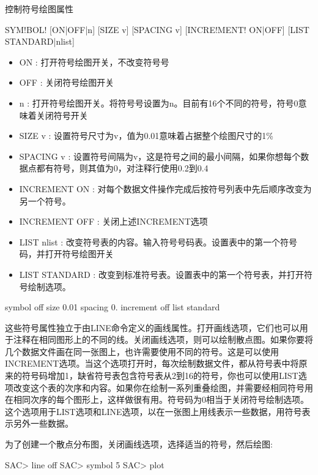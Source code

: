 \label{cmd:symbol}

控制符号绘图属性

\begin{SACSTX}
SYM!BOL! [ON|OFF|n] [SIZE v] [SPACING v] [INCRE!MENT! ON|OFF] 
    [LIST STANDARD|nlist]
\end{SACSTX}

\begin{itemize}
\item ON : 打开符号绘图开关，不改变符号号 
\item OFF : 关闭符号绘图开关 
\item n : 打开符号绘图开关。将符号号设置为n。目前有16个不同的符号，符号0意味着关闭符号开关  
\item SIZE v : 设置符号尺寸为v，值为0.01意味着占据整个绘图尺寸的1\%	
\item SPACING v : 设置符号间隔为v，这是符号之间的最小间隔，如果你想每个数据点都有符号，则其值为0，对注释行使用0.2到0.4
\item INCREMENT {ON} : 对每个数据文件操作完成后按符号列表中先后顺序改变为另一个符号。 
\item INCREMENT OFF : 关闭上述INCREMENT选项 
\item LIST nlist : 改变符号表的内容。输入符号号码表。设置表中的第一个符号码，并打开符号绘图开关 
\item LIST STANDARD : 改变到标准符号表。设置表中的第一个符号表，并打开符号绘制选项。 
\end{itemize}

\begin{SACDFT}
symbol off size 0.01 spacing 0. increment off list standard
\end{SACDFT}

这些符号属性独立于由LINE命令定义的画线属性。打开画线选项，它们也可以用于注释在相同图形上的不同的线。关闭画线选项，则可以绘制散点图。如果你要将几个数据文件画在同一张图上，也许需要使用不同的符号。这是可以使用INCREMENT选项。当这个选项打开时，每次绘制数据文件，都从符号表中将原来的符号码增加1，缺省符号表包含符号表从2到16的符号，你也可以使用LIST选项改变这个表的次序和内容。如果你在绘制一系列重叠绘图，并需要经相同符号用在相同次序的每个图形上，这样做很有用。符号码为0相当于关闭符号绘制选项。这个选项用于LIST选项和LINE选项，以在一张图上用线表示一些数据，用符号表示另外一些数据。

为了创建一个散点分布图，关闭画线选项，选择适当的符号，然后绘图:
\begin{SACCode}
SAC> line off
SAC> symbol 5
SAC> plot
\end{SACCode}

